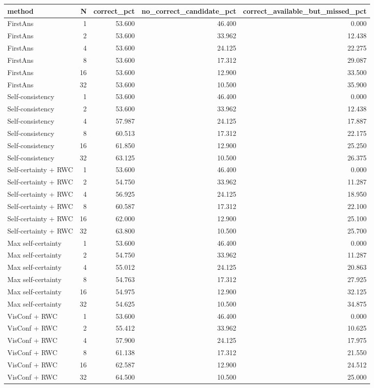 \begin{tabular}{lrrrr}
\toprule
method & N & correct\_pct & no\_correct\_candidate\_pct & correct\_available\_but\_missed\_pct \\
\midrule
FirstAns & 1 & 53.600 & 46.400 & 0.000 \\
FirstAns & 2 & 53.600 & 33.962 & 12.438 \\
FirstAns & 4 & 53.600 & 24.125 & 22.275 \\
FirstAns & 8 & 53.600 & 17.312 & 29.087 \\
FirstAns & 16 & 53.600 & 12.900 & 33.500 \\
FirstAns & 32 & 53.600 & 10.500 & 35.900 \\
Self-consistency & 1 & 53.600 & 46.400 & 0.000 \\
Self-consistency & 2 & 53.600 & 33.962 & 12.438 \\
Self-consistency & 4 & 57.987 & 24.125 & 17.887 \\
Self-consistency & 8 & 60.513 & 17.312 & 22.175 \\
Self-consistency & 16 & 61.850 & 12.900 & 25.250 \\
Self-consistency & 32 & 63.125 & 10.500 & 26.375 \\
Self-certainty + RWC & 1 & 53.600 & 46.400 & 0.000 \\
Self-certainty + RWC & 2 & 54.750 & 33.962 & 11.287 \\
Self-certainty + RWC & 4 & 56.925 & 24.125 & 18.950 \\
Self-certainty + RWC & 8 & 60.587 & 17.312 & 22.100 \\
Self-certainty + RWC & 16 & 62.000 & 12.900 & 25.100 \\
Self-certainty + RWC & 32 & 63.800 & 10.500 & 25.700 \\
Max self-certainty & 1 & 53.600 & 46.400 & 0.000 \\
Max self-certainty & 2 & 54.750 & 33.962 & 11.287 \\
Max self-certainty & 4 & 55.012 & 24.125 & 20.863 \\
Max self-certainty & 8 & 54.763 & 17.312 & 27.925 \\
Max self-certainty & 16 & 54.975 & 12.900 & 32.125 \\
Max self-certainty & 32 & 54.625 & 10.500 & 34.875 \\
VisConf + RWC & 1 & 53.600 & 46.400 & 0.000 \\
VisConf + RWC & 2 & 55.412 & 33.962 & 10.625 \\
VisConf + RWC & 4 & 57.900 & 24.125 & 17.975 \\
VisConf + RWC & 8 & 61.138 & 17.312 & 21.550 \\
VisConf + RWC & 16 & 62.587 & 12.900 & 24.512 \\
VisConf + RWC & 32 & 64.500 & 10.500 & 25.000 \\
\bottomrule
\end{tabular}
